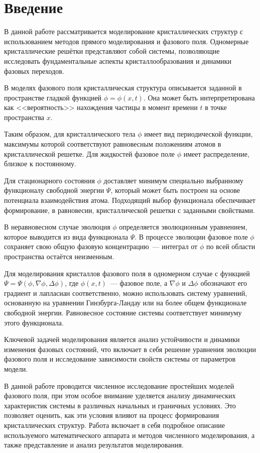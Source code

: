 %
%

\section{Введение}

В данной работе рассматривается моделирование кристаллических структур с использованием методов прямого моделирования и фазового поля. Одномерные кристаллические решётки представляют собой системы, позволяющие исследовать фундаментальные аспекты кристаллообразования и динамики фазовых переходов.

В моделях фазового поля кристаллическая структура описывается заданной в пространстве гладкой функцией $\phi = \phi(x, t)$. Она может быть интерпретирована как <<вероятность>> нахождения частицы в момент времени $t$ в точке пространства $x$.

Таким образом, для кристаллического тела $\phi$ имеет вид периодической функции, максимумы которой соответствуют равновесным положениям атомов в кристаллической решетке. Для жидкостей фазовое поле $\phi$ имеет распределение, близкое к постоянному.

Для стационарного состояния $\phi$ доставляет минимум специально выбранному функционалу свободной энергии $\Psi$, который может быть построен на основе потенциала взаимодействия атома. Подходящий выбор функционала обеспечивает формирование, в равновесии, кристаллической решетки с заданными свойствами.

В неравновесном случае эволюция $\phi$ определяется эволюционным уравнением, которое выводится из вида функционала $\Psi$. В процессе эволюции фазовое поле $\phi$ сохраняет свою общую фазовую концентрацию~--- интеграл от $\phi$ по всей области пространства остаётся неизменным.


Для моделирования кристаллов фазового поля в одномерном случае с функцией $\Psi = \Psi(\phi, \nabla \phi, \Delta \phi)$, где $\phi (x, t)$~--- фазовое поле, а $\nabla \phi$ и $\Delta \phi$ обозначают его градиент и лапласиан соответственно, можно использовать систему уравнений, основанную на уравнении Гинзбурга-Ландау или на более общем функционале свободной энергии. Равновесное состояние системы соответствует минимуму этого функционала.

Ключевой задачей моделирования является анализ устойчивости и динамики изменения фазовых состояний, что включает в себя решение уравнения эволюции фазового поля и исследование зависимости свойств системы от параметров модели.

В данной работе проводится численное исследование простейших моделей фазового поля, при этом особое внимание уделяется анализу динамических характеристик системы в различных начальных и граничных условиях. Это позволяет оценить, как эти условия влияют на процесс формирования кристаллических структур. Работа включает в себя подробное описание используемого математического аппарата и методов численного моделирования, а также представление и анализ результатов моделирования.

\endinput
